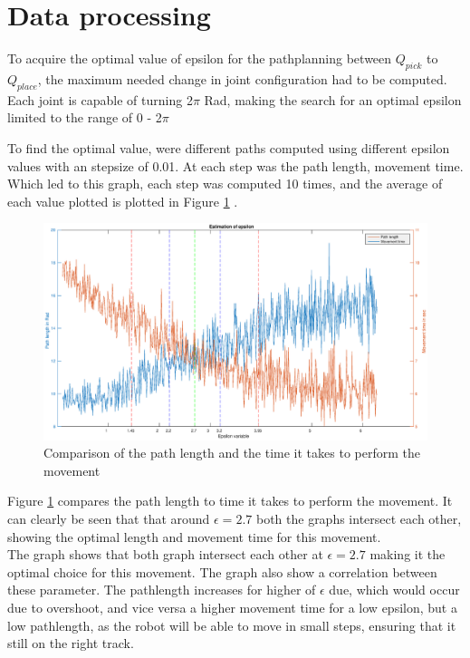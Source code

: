 \documentclass[11pt]{article}
\begin{document}
\section{Data processing}
To acquire the optimal value of epsilon for the pathplanning between $Q_{pick}$ to $Q_{place}$,  the maximum needed change in joint configuration had to be computed. Each joint is capable of turning 2$\pi$ Rad, making the search for an optimal epsilon limited to the range of 0 - 2$\pi$
 
 
\noindent To find the optimal value, were different paths computed using different epsilon values with an stepsize of 0.01.  At each step was the path length, movement time.   Which led to this graph, each step was computed 10 times, and the average of each value plotted is plotted in Figure \ref{fig::graph} .\\[0.2cm]

\begin{figure}[H]
\hspace{-3.5cm}\includegraphics[scale=0.55]{img/graph.eps}
\caption{Comparison of the path length and the time it takes to perform the movement}
\label{fig::graph}
\end{figure}

\noindent Figure \ref{fig::graph}  compares the path length  to time it takes to perform the movement.  It can clearly be seen that  that around $\epsilon = 2.7$  both the graphs intersect each other, showing the optimal length and movement time  for this movement.\\[0.2cm]
The graph shows that both graph intersect each other at $\epsilon = 2.7$ making it the optimal choice for this movement.  The graph also show a correlation between these parameter.  The pathlength increases for higher of $\epsilon$ due, which would occur due to overshoot, and vice versa a higher movement time for a low epsilon, but a low pathlength, as the robot will be able to move in small steps, ensuring that it still on the right track. 
\end{document}
